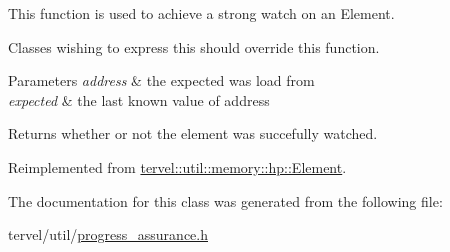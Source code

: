 This function is used to achieve a strong watch on an Element. 

Classes wishing to express this should override this function.


\begin{DoxyParams}{Parameters}
{\em address} & the expected was load from \\
\hline
{\em expected} & the last known value of address \\
\hline
\end{DoxyParams}
\begin{DoxyReturn}{Returns}
whether or not the element was succefully watched. 
\end{DoxyReturn}


Reimplemented from \hyperlink{classtervel_1_1util_1_1memory_1_1hp_1_1_element_a53493ef4754dd77016139863af964f90}{tervel\+::util\+::memory\+::hp\+::\+Element}.



The documentation for this class was generated from the following file\+:\begin{DoxyCompactItemize}
\item 
tervel/util/\hyperlink{progress__assurance_8h}{progress\+\_\+assurance.\+h}\end{DoxyCompactItemize}
